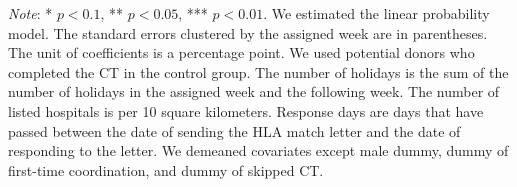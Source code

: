 \documentclass[12pt, a4paper]{article}
\begin{document}
\begin{table}[H]
\begin{threeparttable}
\begin{tablenotes}
\item \emph{Note}: * $p < 0.1$, ** $p < 0.05$, *** $p < 0.01$. We estimated the linear probability model. The standard errors clustered by the assigned week are in parentheses. The unit of coefficients is a percentage point. We used potential donors who completed the CT in the control group. The number of holidays is the sum of the number of holidays in the assigned week and the following week. The number of listed hospitals is per 10 square kilometers. Response days are days that have passed between the date of sending the HLA match letter and the date of responding to the letter. We demeaned covariates except male dummy, dummy of first-time coordination, and dummy of skipped CT.
\end{tablenotes}
\end{threeparttable}
\end{table}

\clearpage
\end{document}
